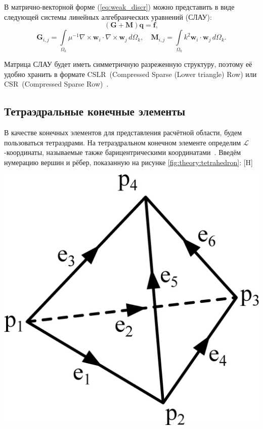 \documentclass[a4paper,14pt]{article}
\makeatletter
\renewenvironment{figure}[1][\fps@figure]{
  \edef\@tempa{\noexpand\@float{figure}[#1]}
  \@tempa
  \addtocounter{foofigure}{1}
}{
  \end@float
}
\makeatother
\begin{document}
В матрично-векторной форме (\ref{eq:weak_discr}) можно представить в виде следующей системы линейных алгебраических уравнений (СЛАУ):
\begin{equation}
	( \mathbf{G} + \mathbf{M} )\mathbf{q} = \mathbf{f} , \label{eq:form_29}
\end{equation}
\begin{equation*}
	\mathbf{G}_{ i,j } = \int\limits_{\Omega_k} \mu^{-1} \nabla \times \mathbf{w}_i \cdot \nabla \times \mathbf{w}_j \,d\Omega_k , \text{~~~}
	\mathbf{M}_{ i,j } = \int\limits_{\Omega_k} k^2 \mathbf{w}_i \cdot \mathbf{w}_j \,d\Omega_k . \label{eq:local_matrixes}
\end{equation*}

Матрица СЛАУ будет иметь симметричную разреженную структуру, поэтому её удобно хранить в формате CSLR~(Compressed Sparse (Lower triangle) Row) или CSR~(Compressed Sparse Row)~\citep{balandin_slae}.


\subsection{Тетраэдральные конечные элементы}

В качестве конечных элементов для представления расчётной области, будем пользоваться тетраэдрами. На тетраэдральном конечном элементе определим $\mathcal{L}$-ко\-ор\-ди\-на\-ты, называемые также барицентрическими координатами~\citep{soloveychick}. Введём нумерацию вершин и рёбер, показанную на рисунке \ref{fig:theory:tetrahedron}:
\begin{figure}[H]
	\centering
	\includegraphics[scale=0.25]{theory/tetrahedron.eps}
	\caption{тетраэдральный конечный элемент}
	\label{fig:theory:tetrahedron}
\end{figure}
\end{document}
